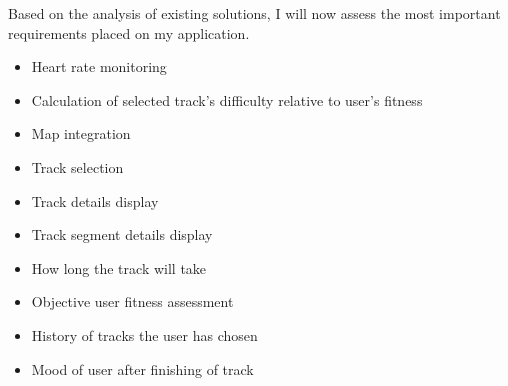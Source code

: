 \linebreak
Based on the analysis of existing solutions, I will now assess the most important requirements placed on my application.
\begin{itemize}
    \item Heart rate monitoring
    \item Calculation of selected track's difficulty relative to user's fitness
    \item Map integration
    \item Track selection
    \item Track details display
    \item Track segment details display
    \item How long the track will take 
    \item Objective user fitness assessment
    \item History of tracks the user has chosen
    \item Mood of user after finishing of track
\end{itemize}